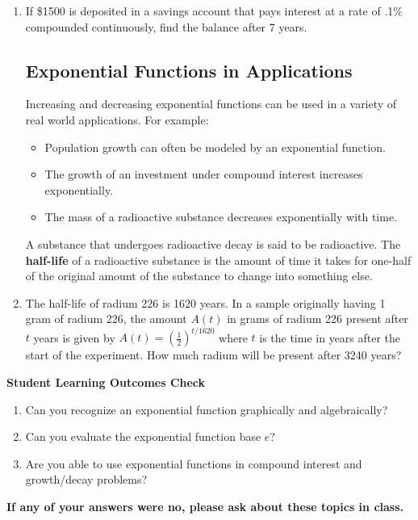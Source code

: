 \begin{enumerate}
\item If \$1500 is deposited in a savings account that pays interest at a rate of .1\% compounded continuously, find the balance after 7 years. \\[1in]


\newpage

\subsection{Exponential Functions in Applications} 
Increasing and decreasing exponential functions can be used in a
variety of real world applications.  For example:
\begin{itemize}
\item Population growth can often be modeled by an exponential function.
\item The growth of an investment under compound interest increases exponentially.
\item The mass of a radioactive substance decreases exponentially with time.
\end{itemize}

\noindent A substance that undergoes radioactive decay is said to be radioactive.  The \textbf{half-life} of a radioactive substance is the amount of time it takes for one-half of the original amount of the substance to change into something else.

\item The half-life of radium 226 is 1620 years.  In a sample originally having 1 gram of radium 226, the amount $A(t)$ in grams of radium 226 present after $t$ years is given by $\displaystyle A(t)=(\frac{1}{2})^{t/1620}$ where $t$ is the time in years after the start of the experiment.  How much radium will be present after 3240 years? 
\vfill


\end{enumerate}

\noindent \textbf{Student Learning Outcomes Check}

\begin{enumerate}
\item Can you recognize an exponential function graphically and algebraically?
\item Can you evaluate the exponential function base $e$?
\item Are you able to use exponential functions in compound interest and growth/decay problems?

\end{enumerate}

\noindent \textbf{If any of your answers were no, please ask about these topics in class.}

